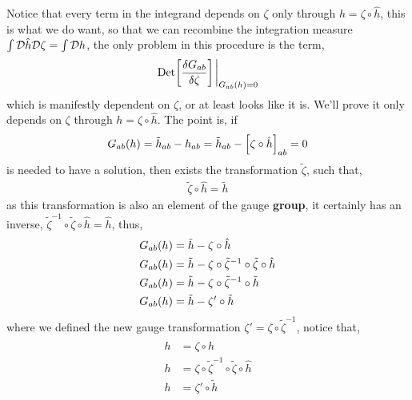 Notice that every term in the integrand depends on $\zeta$ only through $h=\zeta\circ \hat h$, this is what we do want, so that we can 
recombine the integration measure $\int\mathcal D \hat h\mathcal D \zeta=\int\mathcal D h$, the only problem in this procedure is the term,
\begin{align*}
    \Det\qty[\fdv{G_{ab}}{\zeta}]\eval_{G_{ab}\qty(h)=0}
\end{align*}
which is manifestly dependent on $\zeta$, or at least looks like it is. We'll prove it only depends on $\zeta$ through 
$h = \zeta\circ \hat h$. The point is, if
\begin{align*}
    G_{ab}\qty(h)={\tilde h}_{ab}-h_{ab}={\tilde h}_{ab}-\qty[\zeta\circ \hat h]_{ab}=0
\end{align*}
is needed to have a solution, then exists the transformation $\tilde\zeta$, such that,
\begin{align*}
    \tilde\zeta\circ \hat h=\tilde h
\end{align*}
as this transformation is also an element of the gauge \textbf{group}, it certainly has an inverse, $\tilde\zeta^{-1}\circ \tilde \zeta \circ \hat h=\hat h$, thus, 
\begin{align*}
    G_{ab}\qty(h)&=\tilde h-\zeta\circ \hat h\\
    G_{ab}\qty(h)&=\tilde h-\zeta\circ \tilde\zeta^{-1}\circ \tilde \zeta\circ\hat h\\
    G_{ab}\qty(h)&=\tilde h-\zeta\circ \tilde\zeta^{-1}\circ \tilde h\\
    G_{ab}\qty(h)&=\tilde h-\zeta'\circ \tilde h
\end{align*}
where we defined the new gauge transformation $\zeta'=\zeta\circ \tilde \zeta^{-1}$, notice that,
\begin{align*}
    h&=\zeta\circ \hat h\\
    h&=\zeta\circ \tilde\zeta^{-1}\circ \tilde \zeta \circ\hat h\\
    h&=\zeta'\circ \tilde h
\end{align*}
